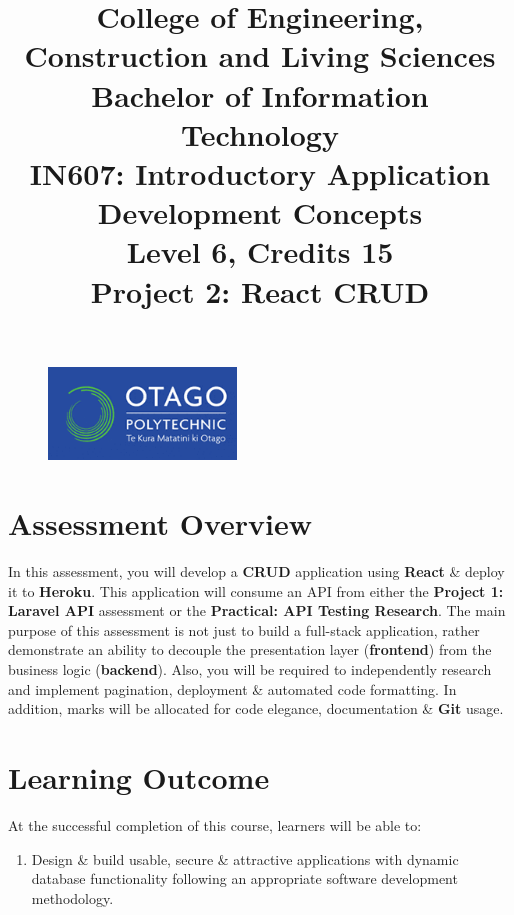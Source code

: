 \documentclass{article}
\author{}
\begin{document}
\begin{figure}
    \centering
    \includegraphics[width=50mm]{../img/logo.png}
\end{figure}

\title{College of Engineering, Construction and Living Sciences\\Bachelor of Information Technology\\IN607: Introductory Application Development Concepts\\Level 6, Credits 15\\\textbf{Project 2: React CRUD}}
\date{}
\maketitle

\section*{Assessment Overview}
In this assessment, you will develop a \textbf{CRUD} application using \textbf{React} \& deploy it to \textbf{Heroku}. This application will consume an API from either the \textbf{Project 1: Laravel API} assessment or the \textbf{Practical: API Testing Research}. The main purpose of this assessment is not just to build a full-stack application, rather demonstrate an ability to decouple the presentation layer (\textbf{frontend}) from the business logic (\textbf{backend}). Also, you will be required to independently research and implement pagination, deployment \& automated code formatting. In addition, marks will be allocated for code elegance, documentation \& \textbf{Git} usage.

\section*{Learning Outcome}
At the successful completion of this course, learners will be able to:
\begin{enumerate}
    \item Design \& build usable, secure \& attractive applications with dynamic database functionality following an appropriate software development methodology.
\end{enumerate}
\end{document}
